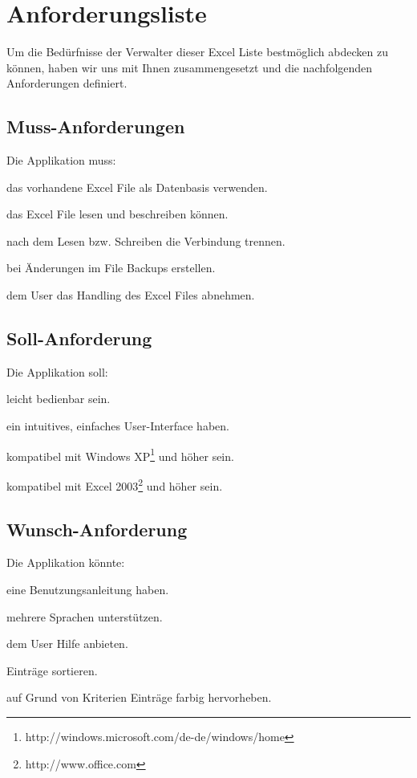 \documentclass{article}
\begin{document}
\newpage


\section{Anforderungsliste}
Um die Bedürfnisse der Verwalter dieser Excel Liste bestmöglich abdecken zu können, haben wir uns mit Ihnen zusammengesetzt und die nachfolgenden Anforderungen definiert.
	
\subsection{Muss-Anforderungen}
Die Applikation muss:
	\begin{description}[labelindent=1cm]
		\item[M1:] das vorhandene Excel File als Datenbasis verwenden.
		\item[M2:] das Excel File lesen und beschreiben können.
		\item[M3:] nach dem Lesen bzw. Schreiben die Verbindung trennen.
		\item[M4:] bei Änderungen im File Backups erstellen.
		\item[M5:] dem User das Handling des Excel Files abnehmen.
	\end{description}

\subsection{Soll-Anforderung}
Die Applikation soll:
\begin{description}[labelindent=1cm]
	\item[S1:] leicht bedienbar sein.
	\item[S2:] ein intuitives, einfaches User-Interface haben.
	\item[S3:] kompatibel mit Windows XP\footnote{http://windows.microsoft.com/de-de/windows/home} und höher sein.
	\item[S4:] kompatibel mit Excel 2003\footnote{http://www.office.com} und höher sein.
\end{description}

\subsection{Wunsch-Anforderung}
Die Applikation könnte:
\begin{description}[labelindent=1cm]
	\item[W1:] eine Benutzungsanleitung haben.
	\item[W2:] mehrere Sprachen unterstützen.
	\item[W3:] dem User Hilfe anbieten.
	\item[W4:] Einträge sortieren.
	\item[W5:] auf Grund von Kriterien Einträge farbig hervorheben.
	\\
\end{description}
\end{document}
